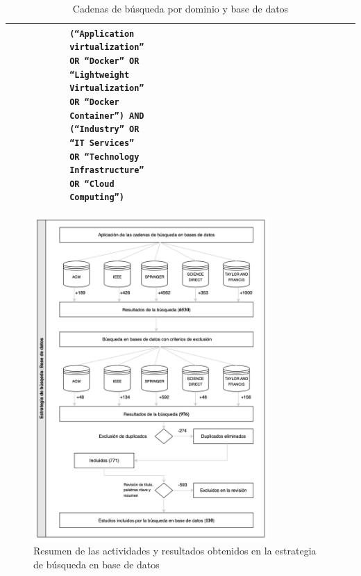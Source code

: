 \begin{table}
\begin{adjustbox}{max width=\textwidth}
\begin{tabular}{|P{0.18\linewidth}|P{0.20\linewidth}|P{0.20\linewidth}|P{0.20\linewidth}|P{0.20\linewidth}|P{0.20\linewidth}|}
& \tiny \texttt{(``Application virtualization'' OR ``Docker'' OR ``Lightweight Virtualization'' OR ``Docker Container'') AND (``Industry'' OR ``IT Services'' OR ``Technology Infrastructure'' OR ``Cloud Computing'')} \\
\hline
\end{tabular}
\end{adjustbox}
\caption{Cadenas de búsqueda por dominio y base de datos}\label{tab:cadenas-busqueda}
\end{table}


\begin{figure}[tbp]
    \centering
    \includegraphics[width=0.8\textwidth]{resources/images/busqueda-estudios/busqueda-bd.png}
    \caption{Resumen de las actividades y resultados obtenidos en la estrategia de búsqueda en base de datos}\label{fig:resumen-busqueda-bds}
\end{figure}

